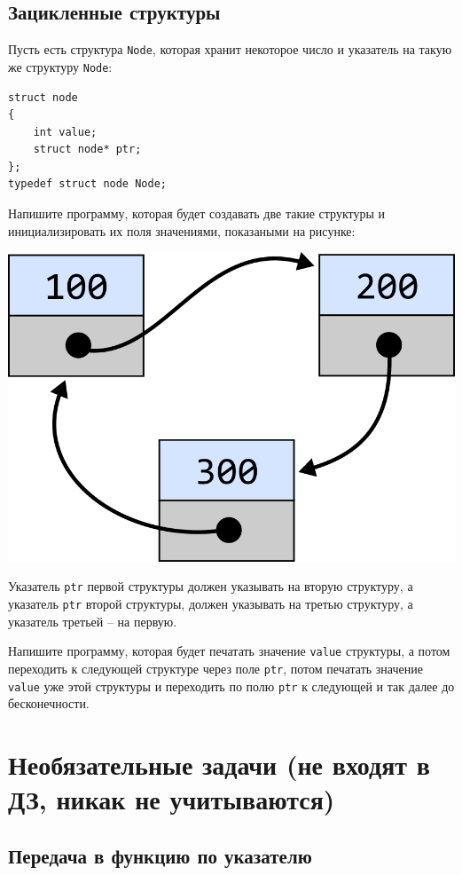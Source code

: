 \documentclass[10pt]{article}
\begin{document}
\subsection{Зацикленные структуры}
Пусть есть структура \texttt{Node}, которая хранит некоторое число и указатель на такую же структуру \texttt{Node}:
\begin{lstlisting}
struct node
{
    int value;
    struct node* ptr;
};
typedef struct node Node;
\end{lstlisting}
Напишите программу, которая будет создавать две такие структуры и инициализировать их поля значениями, показаными на рисунке:
\begin{center}
\includegraphics[scale=0.8]{../images/cycle2.png}
\end{center}
Указатель \texttt{ptr} первой структуры должен указывать на вторую структуру, а указатель \texttt{ptr} второй структуры, должен указывать на третью структуру, а указатель третьей -- на первую.

Напишите программу, которая будет печатать значение \texttt{value} структуры, а потом переходить к следующей структуре через поле \texttt{ptr}, потом печатать значение \texttt{value} уже этой структуры и переходить по полю \texttt{ptr} к следующей и так далее до бесконечности.

\newpage
\section*{Необязательные задачи (не входят в ДЗ, никак не учитываются)}
\setcounter{subsection}{0}


\subsection{Передача в функцию по указателю}
\end{document}
